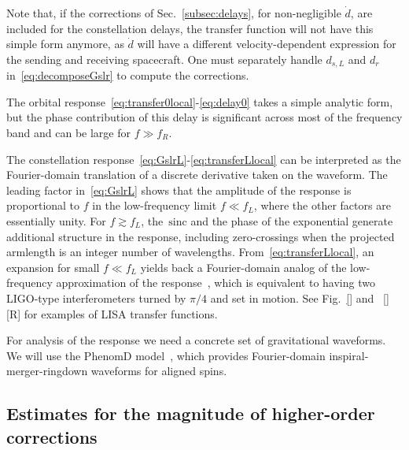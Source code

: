 \documentclass[aps,showpacs,twocolumn,
prd,superscriptaddress,nofootinbib]{revtex4-1}
\newcommand{\sinc}{\,\mathrm{sinc}}
\newcommand{\SM}[1]{{\color{Red} #1}}
\newcommand{\jgb}[1]{{\color{DarkGreen} #1}}
\begin{document}
Note that, if the corrections of Sec.~\ref{subsec:delays}, \jgb{for non-negligible $\dot d$}, are included for the constellation delays, the transfer function will not have this simple form anymore, as $\dot{d}$ will have a different velocity-dependent expression for the sending and receiving spacecraft. One must \jgb{separately handle $d_{s,L}$ and $d_{r}$ in~\eqref{eq:decomposeGslr} to compute the corrections.}

The \jgb{orbital} response~\eqref{eq:transfer0local}-\eqref{eq:delay0} takes a simple analytic form, but the phase contribution of this delay is significant across most of the frequency band and can be large for $f \gg f_{R}$.

The \jgb{constellation} response~\eqref{eq:GslrL}-\eqref{eq:transferLlocal} can be interpreted as the Fourier-domain translation of a discrete derivative taken on the waveform. The \jgb{leading factor in~\eqref{eq:GslrL}} shows that the amplitude of the response is proportional to $f$ in the low-frequency limit $f\ll f_{L}$, where the other factors are essentially unity. For $f\gtrsim f_{L}$, the $\sinc$ and the phase of the exponential generate additional structure in the response, including zero-crossings when the projected armlength \jgb{is an integer number of wavelengths}. From~\eqref{eq:transferLlocal}, an expansion for small $f\ll f_{L}$ yields back a Fourier-domain analog of the low-frequency approximation of the response~\cite{Cutler97, RCP04}, which \jgb{is equivalent to} having two LIGO-type interferometers turned by $\pi/4$ and set in motion. See Fig.~\ref{} and ~\ref{} \SM{[R]} for examples of LISA transfer functions.

\jgb{For analysis of the response we need a concrete set of gravitational waveforms. We will} use the PhenomD model~\cite{Khan+15,Husa+15}, which provides Fourier-domain inspiral-merger-ringdown waveforms for aligned spins.


\subsection{Estimates for the magnitude of higher-order corrections}
\label{subsec:lisafom}
\end{document}
